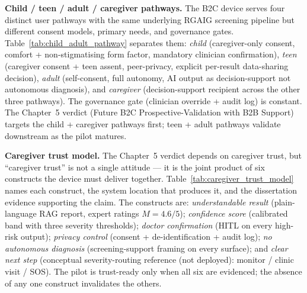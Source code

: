

\noindent\textbf{Child / teen / adult / caregiver pathways.} The B2C device serves four distinct user pathways with the same underlying RGAIG screening pipeline but different consent models, primary needs, and governance gates. Table~\ref{tab:child_adult_pathway} separates them: \emph{child} (caregiver-only consent, comfort + non-stigmatising form factor, mandatory clinician confirmation), \emph{teen} (caregiver consent + teen assent, peer-privacy, explicit per-result data-sharing decision), \emph{adult} (self-consent, full autonomy, AI output as decision-support not autonomous diagnosis), and \emph{caregiver} (decision-support recipient across the other three pathways). The governance gate (clinician override + audit log) is constant. The Chapter~5 verdict (Future B2C Prospective-Validation with B2B Support) targets the child + caregiver pathways first; teen + adult pathways validate downstream as the pilot matures.



\noindent\textbf{Caregiver trust model.} The Chapter~5 verdict depends on caregiver trust, but ``caregiver trust'' is not a single attitude --- it is the joint product of six constructs the device must deliver together. Table~\ref{tab:caregiver_trust_model} names each construct, the system location that produces it, and the dissertation evidence supporting the claim. The constructs are: \emph{understandable result} (plain-language RAG report, expert ratings $M = 4.6/5$); \emph{confidence score} (calibrated band with three severity thresholds); \emph{doctor confirmation} (HITL on every high-risk output); \emph{privacy control} (consent + de-identification + audit log); \emph{no autonomous diagnosis} (screening-support framing on every surface); and \emph{clear next step} (conceptual severity-routing reference (not deployed): monitor / clinic visit / SOS). The pilot is trust-ready only when all six are evidenced; the absence of any one construct invalidates the others.



